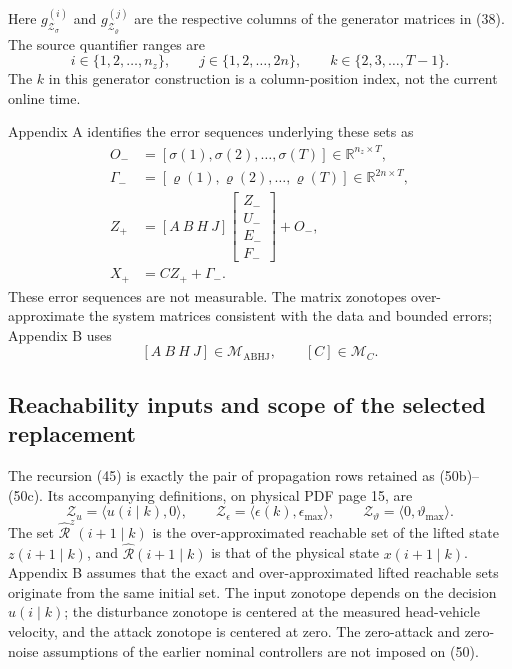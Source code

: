 \documentclass{article}
\begin{document}
Here $g_{\mathcal{Z}_{\sigma}}^{(i)}$ and $g_{\mathcal{Z}_{\varrho}}^{(j)}$ are the respective columns of the generator matrices in (38). The source quantifier ranges are
\[
i\in\{1,2,\ldots,n_z\},\qquad j\in\{1,2,\ldots,2n\},\qquad k\in\{2,3,\ldots,T-1\}.
\]
The $k$ in this generator construction is a column-position index, not the current online time.

Appendix A identifies the error sequences underlying these sets as
\begin{align}
O_-&=[\sigma(1),\sigma(2),\ldots,\sigma(T)]\in\mathbb{R}^{n_z\times T}, \tag{A.1}\\
\Gamma_-&=[\varrho(1),\varrho(2),\ldots,\varrho(T)]\in\mathbb{R}^{2n\times T}, \tag{A.2}\\
Z_+&=[A\ B\ H\ J]\begin{bmatrix}Z_-\\U_-\\E_-\\F_-\end{bmatrix}+O_-, \tag{A.3}\\
X_+&=CZ_++\Gamma_-. \tag{A.4}
\end{align}
These error sequences are not measurable. The matrix zonotopes over-approximate the system matrices consistent with the data and bounded errors; Appendix B uses
\[
[A\ B\ H\ J]\in\mathcal{M}_{\mathrm{ABHJ}},\qquad [C]\in\mathcal{M}_C.
\]

\subsection*{Reachability inputs and scope of the selected replacement}
The recursion (45) is exactly the pair of propagation rows retained as (50b)--(50c). Its accompanying definitions, on physical PDF page 15, are
\[
\mathcal{Z}_u=\langle u(i\mid k),0\rangle,\qquad
\mathcal{Z}_{\epsilon}=\langle\epsilon(k),\epsilon_{\max}\rangle,\qquad
\mathcal{Z}_{\vartheta}=\langle0,\vartheta_{\max}\rangle.
\]
The set $\hat{\mathcal{R}}^z(i+1\mid k)$ is the over-approximated reachable set of the lifted state $z(i+1\mid k)$, and $\hat{\mathcal{R}}(i+1\mid k)$ is that of the physical state $x(i+1\mid k)$. Appendix B assumes that the exact and over-approximated lifted reachable sets originate from the same initial set. The input zonotope depends on the decision $u(i\mid k)$; the disturbance zonotope is centered at the measured head-vehicle velocity, and the attack zonotope is centered at zero. The zero-attack and zero-noise assumptions of the earlier nominal controllers are not imposed on (50).
\end{document}
